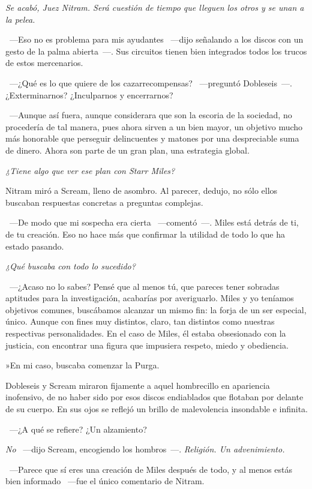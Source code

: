 \emph{Se acabó, Juez Nitram. Será cuestión de tiempo que lleguen los otros y se unan a la pelea.}

~---Eso no es problema para mis ayudantes ~---dijo señalando a los discos con un gesto de la palma abierta~---. Sus circuitos tienen bien integrados todos los trucos de estos mercenarios.

~---¿Qué es lo que quiere de los cazarrecompensas? ~---preguntó Dobleseis~---. ¿Exterminarnos? ¿Inculparnos y encerrarnos?

~---Aunque así fuera, aunque considerara que son la escoria de la sociedad, no procedería de tal manera, pues ahora sirven a un bien mayor, un objetivo mucho más honorable que perseguir delincuentes y matones por una despreciable suma de dinero. Ahora son parte de un gran plan, una estrategia global.

\emph{¿Tiene algo que ver ese plan con Starr Miles?}

Nitram miró a Scream, lleno de asombro. Al parecer, dedujo, no sólo ellos buscaban respuestas concretas a preguntas complejas.

~---De modo que mi sospecha era cierta ~---comentó~---. Miles está detrás de ti, de tu creación. Eso no hace más que confirmar la utilidad de todo lo que ha estado pasando.

\emph{¿Qué buscaba con todo lo sucedido?}

~---¿Acaso no lo sabes? Pensé que al menos tú, que pareces tener sobradas aptitudes para la investigación, acabarías por averiguarlo. Miles y yo teníamos objetivos comunes, buscábamos alcanzar un mismo fin: la forja de un ser especial, único. Aunque con fines muy distintos, claro, tan distintos como nuestras respectivas personalidades. En el caso de Miles, él estaba obsesionado con la justicia, con encontrar una figura que impusiera respeto, miedo y obediencia.

»En mi caso, buscaba comenzar la Purga.

Dobleseis y Scream miraron fijamente a aquel hombrecillo en apariencia inofensivo, de no haber sido por esos discos endiablados que flotaban por delante de su cuerpo. En sus ojos se reflejó un brillo de malevolencia insondable e infinita.

~---¿A qué se refiere? ¿Un alzamiento?

\emph{No} ~---dijo Scream, encogiendo los hombros~---. \emph{Religión. Un advenimiento.}

~---Parece que sí eres una creación de Miles después de todo, y al menos estás bien informado ~---fue el único comentario de Nitram.

